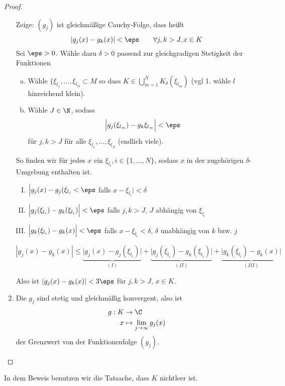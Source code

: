 \documentclass{mycourse}
\begin{document}
\begin{st}
\begin{proof}
\begin{enumerate}[1)]
					Zeige: $(g_j)$ ist gleichmäßige Cauchy-Folge, dass heißt
					\[
						|g_j(x) - g_k(x)| < \eps
						\qquad \forall j,k > J, x \in K
					\]
					Sei $ \eps>0 $. Wähle dazu $ \delta >0 $ passend zur gleichgradigen Stetigkeit der Funktionen
					\begin{enumerate}[a)]
						\item
							Wähle $\{\xi_{l_1}, \dotsc, \xi_{l_N} \subset M$ so dass $K \in \bigcup_{m=1}^N K_\delta (\xi_{l_m})$ (vgl 1. wähle $l$ hinreichend klein).
						\item
							Wähle $J \in \N$, sodass 
							\[
								\Big| g_j(\xi_{l_m}) - g_k{\xi_{l_m}} \Big| < \eps
							\]
							für $j,k > J$ für alle $\xi_{l_1}, \dotsc, \xi_{l_N}$ (endlich viele).
					\end{enumerate}
					So finden wir für jedes $ x $ ein $ \xi_{l_i}, i\in\{1,...,N\} $, sodass $ x $ in der zugehörigen $\delta $-Umgebung enthalten ist.
					\begin{enumerate}[(I)]
					\item $\Big|g_j(x)-g_j(\xi_{l_i}< \eps$ falls $x-\xi_{l_i}|<\delta$
					\item $ \Big|g_j(\xi_{l_i}) - g_k(\xi_{l_i})\Big| <\eps$ falls $j,k > J$, $J$ abhängig von $\xi_{l_i}$
					\item $ \Big| g_k(\xi_{l_i}) - g_k(x)\Big| <\eps$ falls $x-\xi_{l_i} < \delta$, $\delta$ unabhängig von $k$ bzw. $j$
					\end{enumerate}
					\[
						|g_j(x) - g_k(x)| 
						\le \underbrace{\Big|g_j(x)-g_j(\xi_{l_i})\Big|}_{(I)} 
						+ \underbrace{\Big|g_j(\xi_{l_i}) - g_k(\xi_{l_i})\Big|}_{(II)}  + \underbrace{\Big| g_k(\xi_{l_i}) - g_k(x)\Big|}_{(III)} 
					\]
					
					Also ist $|g_j(x) - g_k(x)| < 3 \eps$ für $j,k > J$, $x\in K$.
				
			\item
				Die $g_j$ sind stetig und gleichmäßig konvergent, also ist
				\begin{align*}
					g: K &\to \C \\
					x &\mapsto \lim_{j\to \infty} g_j(x)
				\end{align*}
				der Grenzwert von der Funktionenfolge $ (g_j) $.
		\end{enumerate}
	\end{proof}
\end{st}
\begin{note}
In dem Beweis benutzen wir die Tatsache, dass $ K $ nichtleer ist.
\end{note}
\end{document}
